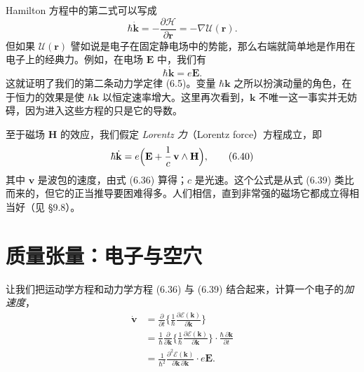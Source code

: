 Hamilton 方程中的第二式可以写成
\begin{equation*}
\hbar\dot{\mathbf{k}}=-\frac{\partial\mathcal{H}}{\partial\mathbf{r}}=-\nabla\mathcal{U}(\mathbf{r}). \tag{6.38}
\end{equation*}
但如果 $\mathcal{U}(\mathbf{r})$ 譬如说是电子在固定静电场中的势能，那么右端就简单地是作用在电子上的经典力。例如，在电场 $\mathbf{E}$ 中，我们有
\begin{equation*}
\hbar\dot{\mathbf{k}}=e\mathbf{E}. \tag{6.39}
\end{equation*}
这就证明了我们的第二条动力学定律 (6.5)。变量 $\hbar\mathbf{k}$ 之所以扮演动量的角色，在于恒力的效果是使 $\hbar\mathbf{k}$ 以恒定速率增大。这里再次看到，$\mathbf{k}$ 不唯一这一事实并无妨碍，因为进入这些方程的只是它的导数。

至于磁场 $\mathbf{H}$ 的效应，我们假定 \emph{Lorentz 力}（Lorentz force）方程成立，即
\begin{equation*}
\hbar\dot{\mathbf{k}}=e\Bigl(\mathbf{E}+\frac{1}{c}\,\mathbf{v}\wedge\mathbf{H}\Bigr), \tag{6.40}
\end{equation*}
其中 $\mathbf{v}$ 是波包的速度，由式 (6.36) 算得；$c$ 是光速。这个公式是从式 (6.39) 类比而来的，但它的正当推导要困难得多。人们相信，直到非常强的磁场它都成立得相当好（见 §9.8）。

\section{质量张量：电子与空穴}

让我们把运动学方程和动力学方程 (6.36) 与 (6.39) 结合起来，计算一个电子的\emph{加速度}，
\begin{align*}
\dot{\mathbf{v}}&=\frac{\partial}{\partial t}\biggl\{\frac{1}{\hbar}\frac{\partial\mathcal{E}(\mathbf{k})}{\partial\mathbf{k}}\biggr\}\\
&=\frac{1}{\hbar}\frac{\partial}{\partial\mathbf{k}}\biggl\{\frac{1}{\hbar}\frac{\partial\mathcal{E}(\mathbf{k})}{\partial\mathbf{k}}\biggr\}\cdot\frac{\hbar\,\partial\mathbf{k}}{\partial t}\\
&=\frac{1}{\hbar^{2}}\frac{\partial^{2}\mathcal{E}(\mathbf{k})}{\partial\mathbf{k}\,\partial\mathbf{k}}\cdot e\mathbf{E}. \tag{6.41}
\end{align*}

